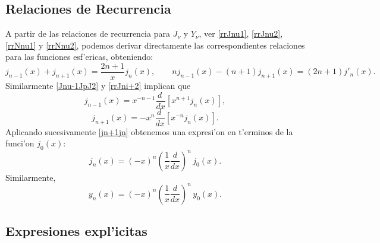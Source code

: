 \subsection{Relaciones de Recurrencia}
A partir de las relaciones de recurrencia para $J_\nu$ y $Y_\nu$, ver \eqref{rrJnu1}, \eqref{rrJnu2}, \eqref{rrNnu1} y \eqref{rrNnu2}, podemos derivar directamente las correspondientes relaciones para las funciones esf'ericas, obteniendo:
\begin{equation}
j_{n-1}(x)+j_{n+1}(x)=\frac{2n+1}{x}j_n(x), \qquad nj_{n-1}(x)-(n+1)j_{n+1}(x)=(2n+1)j'_n(x).
\end{equation}
Similarmente \eqref{Jnu-1JpJ2} y \eqref{rrJni+2} implican que
\begin{equation}
j_{n-1}(x)=x^{-n-1}\frac{d\ }{dx}\left[x^{n+1}j_n(x)\right],
\end{equation}
\begin{equation}\label{jn+1jn}
j_{n+1}(x)=-x^{n}\frac{d\ }{dx}\left[x^{-n}j_n(x)\right].
\end{equation}
Aplicando sucesivamente \eqref{jn+1jn} obtenemos una expresi'on en t'erminos de la funci'on $j_0(x)$:
\begin{equation}
j_n(x) = (-x)^n \left(\frac{1}{x}\frac{d}{dx}\right)^n\,j_0(x) .
\end{equation}
Similarmente,
\begin{equation}
y_n(x) = (-x)^n \left(\frac{1}{x}\frac{d}{dx}\right)^n\,y_0(x).
\end{equation}

\subsection{Expresiones expl'icitas}

